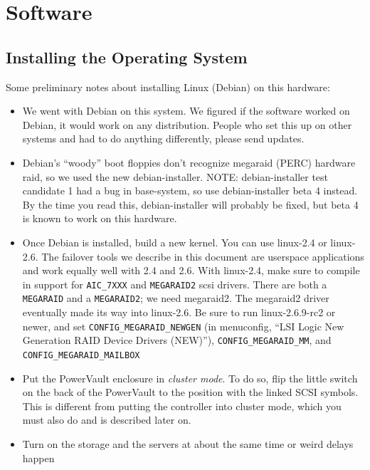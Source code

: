 \documentclass[11pt]{article}
\begin{document}
\section{Software}
\subsection{Installing the Operating System}
Some preliminary notes about installing Linux (Debian) on this hardware:

\begin{itemize}
\item We went with Debian on this system.  We figured if the software worked
  on Debian, it would work on any distribution.  People who set this up
  on other systems and had to do anything differently, please send
  updates.

\item Debian's ``woody'' boot floppies don't recognize megaraid (PERC)
  hardware raid, so we used the new debian-installer.  NOTE:
  debian-installer test candidate 1 had a bug in base-system, so use
  debian-installer beta 4 instead.  By the time you read this,
  debian-installer will probably be fixed, but beta 4 is known to work
  on this hardware.

\item Once Debian is installed, build a new kernel.  You can use
  linux-2.4 or linux-2.6.  The failover tools we describe in this
  document are userspace applications and work equally well with 2.4 and
  2.6.  With linux-2.4, make sure to compile in support for
  \texttt{AIC\_7XXX} and \texttt{MEGARAID2} scsi drivers.  There are
  both a \texttt{MEGARAID} and a \texttt{MEGARAID2}; we need megaraid2.
  The megaraid2 driver eventually made its way into linux-2.6.  Be sure
  to run linux-2.6.9-rc2 or newer, and set
  \texttt{CONFIG\_MEGARAID\_NEWGEN} (in menuconfig, ``LSI Logic New
  Generation RAID Device Drivers (NEW)''),
  \texttt{CONFIG\_MEGARAID\_MM}, and \texttt{CONFIG\_MEGARAID\_MAILBOX}

\item Put the PowerVault enclosure in \emph{cluster mode}.  To do so,
  flip the little switch on the back of the PowerVault to the position
  with the linked SCSI symbols.  This is different from putting the
  controller into cluster mode, which you must also do and is described
  later on.

\item Turn on the storage and the servers at about the same time or
  weird delays happen


\end{itemize}
\end{document}
